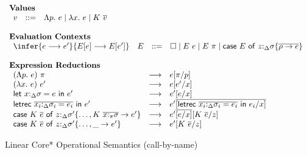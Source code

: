 
\begin{figure}[h]
\begin{framed}
\small
\[
\begin{array}{l}
%
\textbf{Values} \\
\begin{array}{lcl}
    v & ::= & \Lambda p.~e \mid \lambda x.~e \mid K~\overline{v} \\
\end{array}\\\\
%
\textbf{Evaluation Contexts}\\
\begin{array}{llcl}
\infer{e \longrightarrow e'}{E[e] \longrightarrow E[e']} & E & ::= & \square \mid E~e \mid E~\pi \mid \ccase{E}{z{:}_{\Delta}\sigma \{\overline{\rho \to e}\}} \\
\end{array}\\\\
%
\textbf{Expression Reductions}\\
\begin{array}{lcl}
(\Lambda p.~e)~\pi & \longrightarrow & e[\pi/p]\\
%
(\lambda x.~e)~e' & \longrightarrow & e[e'/x]\\
%
\llet{x{:}_\Delta\sigma = e}{e'} & \longrightarrow & e'[e/x]\\
%
\lletrec{\overline{x_i{:}_\Delta\sigma_i = e_i}}{e'} & \longrightarrow &
    e'\overline{[\lletrec{\overline{x_i{:}_\Delta\sigma_i = e_i}}{e_i}/x]}\\
%
\ccase{K~\overline{e}}{z{:}_{\Delta}\sigma' \{\dots, K~\overline{x{:}_\pi\sigma} \to e'\}} &
\longrightarrow & e'\overline{[e/x]}[K~\overline{e}/z]\\
%
\ccase{K~\overline{e}}{z{:}_{\Delta}\sigma' \{\dots, \_ \to e'\}} & \longrightarrow & e'[K~\ov{e}/z]\\
\end{array}
\end{array}
\]
\end{framed}
\caption{Linear Core* Operational Semantics \small(call-by-name)}
\label{linear-core-operational-semantics}
\end{figure}

